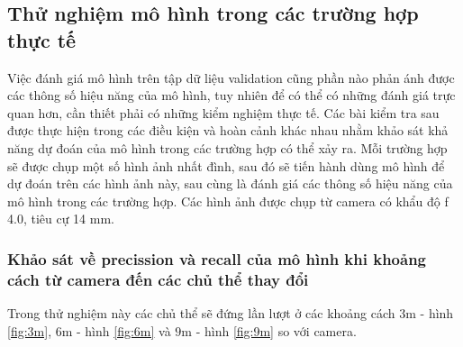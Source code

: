 \subsection{Thử nghiệm mô hình trong các trường hợp thực tế}
Việc đánh giá mô hình trên tập dữ liệu validation cũng phần nào phản ánh được các thông số hiệu năng của mô hình, tuy nhiên để có thể có những đánh giá trực quan hơn, cần thiết phải có những kiểm nghiệm thực tế. Các bài kiểm tra sau được thực hiện trong các điều kiện và hoàn cảnh khác nhau nhằm khảo sát khả năng dự đoán của mô hình trong các trường hợp có thể xảy ra. Mỗi trường hợp sẽ được chụp một số hình ảnh nhất đình, sau đó sẽ tiến hành dùng mô hình để dự đoán trên các hình ảnh này, sau cùng là đánh giá các thông số hiệu năng của mô hình trong các trường hợp. Các hình ảnh được chụp từ camera có khẩu độ f 4.0, tiêu cự 14 mm.
\subsubsection{Khảo sát về precission và recall của mô hình khi khoảng cách từ camera đến các chủ thể thay đổi}
Trong thử nghiệm này các chủ thể sẽ đứng lần lượt ở các khoảng cách $3$m - hình \ref{fig:3m}, $6$m - hình \ref{fig:6m} và $9$m - hình \ref{fig:9m} so với camera. 
